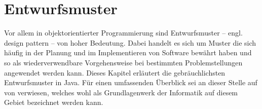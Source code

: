 \section{Entwurfsmuster}\label{designPattern}

Vor allem in objektorientierter Programmierung sind Entwurfsmuster -- engl. design pattern -- von hoher Bedeutung. Dabei handelt es sich um Muster die sich häufig in der Planung und im Implementieren von Software bewährt haben und so als wiederverwendbare Vorgehensweise bei bestimmten Problemstellungen angewendet werden kann. Dieses Kapitel erläutert die gebräuchlichsten Entwurfsmuster in Java. Für einen umfassenden Überblick sei an dieser Stelle auf  von \citeauthor{gamma_design_1995} verwiesen, welches wohl als Grundlagenwerk der Informatik auf diesem Gebiet bezeichnet werden kann.




